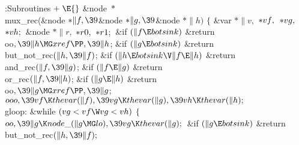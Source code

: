 \Y\B\4:Subroutines\X${}\mathrel+\E{}$\6
\&{node} ${}{*}{}$\\{mux\_rec}(\&{node} ${}{*}\|f,\39{}$\&{node} ${}{*}\|g,%
\39{}$\&{node} ${}{*}\|h){}$\1\1\2\2\6
${}\{{}$\1\6
\&{var} ${}{*}\|v,{}$ ${}{*}\\{vf},{}$ ${}{*}\\{vg},{}$ ${}{*}\\{vh};{}$\6
\&{node} ${}{*}\|r,{}$ ${}{*}\\{r0},{}$ ${}{*}\\{r1};{}$\7
\&{if} ${}(\|f\E\\{botsink}){}$\1\5
\&{return} \\{oo}${},\39\|h\MG\\{xref}\PP,\39\|h{}$;\2%
\6
\&{if} ${}(\|g\E\\{botsink}){}$\1\5
\&{return} \\{but\_not\_rec}${}(\|h,\39\|f){}$;\2\6
\&{if} ${}(\|h\E\\{botsink}\V\|f\E\|h){}$\1\5
\&{return} \\{and\_rec}${}(\|f,\39\|g){}$;\2\6
\&{if} ${}(\|f\E\|g){}$\1\5
\&{return} \\{or\_rec}${}(\|f,\39\|h){}$;\2\6
\&{if} ${}(\|g\E\|h){}$\1\5
\&{return} \\{oo}${},\39\|g\MG\\{xref}\PP,\39\|g{}$;\2%
\6
${}\\{ooo},\39\\{vf}\K\\{thevar}(\|f),\39\\{vg}\K\\{thevar}(\|g),\39\\{vh}\K%
\\{thevar}(\|h);{}$\6
\4\\{gloop}:\5
\&{while} ${}(\\{vg}<\\{vf}\W\\{vg}<\\{vh}){}$\5
${}\{{}$\1\6
${}\\{oo},\39\|g\K\\{node\_}(\|g\MG\\{lo}),\39\\{vg}\K\\{thevar}(\|g);{}$\6
\&{if} ${}(\|g\E\\{botsink}){}$\1\5
\&{return} \\{but\_not\_rec}${}(\|h,\39\|f);{}$\2\6
